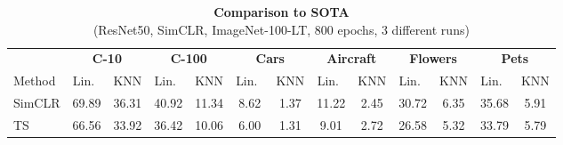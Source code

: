 \begin{table}[t]
\centering
\setlength{\tabcolsep}{2pt}
\caption{\centering \textbf{Comparison to SOTA}\\(ResNet50, SimCLR, ImageNet-100-LT, 800 epochs, 3 different runs)}
{\begin{tabular}{l cc cc cc cc cc cc}
    \toprule
     & \multicolumn{2}{c}{\textbf{C-10}} &  \multicolumn{2}{c}{\textbf{C-100}}  &  \multicolumn{2}{c}{\textbf{Cars}} &  \multicolumn{2}{c}{\textbf{Aircraft}} &  \multicolumn{2}{c}{\textbf{Flowers}} &  \multicolumn{2}{c}{\textbf{Pets}} \\
     \cmidrule(r){2-3}
     \cmidrule(l){4-5}
     \cmidrule(l){6-7}
     \cmidrule(l){8-9}
     \cmidrule(l){10-11}
     \cmidrule(l){12-13}
    Method & Lin.\ & KNN & Lin.\ & KNN & Lin.\ & KNN & Lin.\ & KNN & Lin.\ & KNN & Lin.\ & KNN \\
    \midrule
    \multirow{1}{*}{SimCLR}        & 69.89 & 36.31 & 40.92 & 11.34 &  8.62 &  1.37 & 11.22 &  2.45 & 30.72 &  6.35 & 35.68 &  5.91 \\
    \multirow{1}{*}{TS}    & 66.56 & 33.92 & 36.42 & 10.06 &  6.00 &  1.31 &  9.01 &  2.72 & 26.58 &  5.32 & 33.79 &  5.79 \\
    \bottomrule
\end{tabular}}
\label{table:sota_comp}
\end{table}